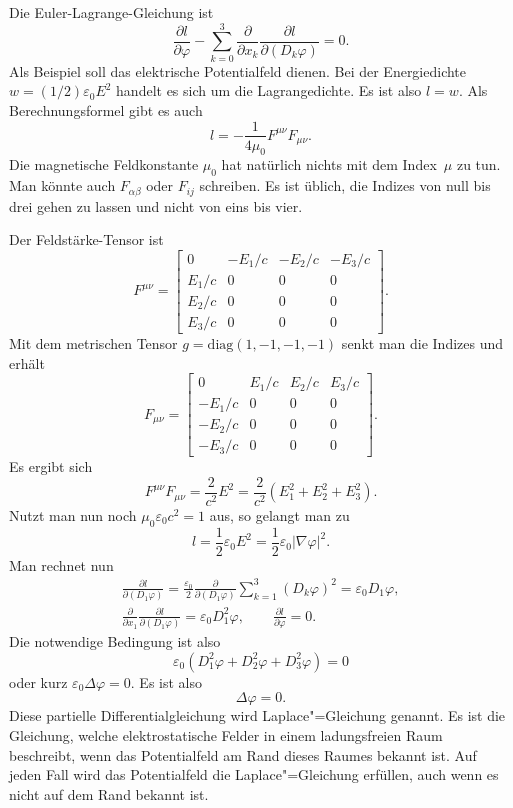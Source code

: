 \documentclass[a4paper,10pt,fleqn,twocolumn,twoside]{article}
\begin{document}
Die Euler-Lagrange-Gleichung ist
\[\frac{\partial l}{\partial\varphi}
- \sum_{k=0}^3 \frac{\partial}{\partial x_k}
\frac{\partial l}{\partial (D_k\varphi)}=0.\]
Als Beispiel soll das elektrische Potentialfeld dienen.
Bei der Energiedichte \(w=(1/2)\varepsilon_0 E^2\) handelt es sich
um die Lagrangedichte. Es ist also \(l=w\).
Als Berechnungsformel gibt es auch
\[l = -\frac{1}{4\mu_0} F^{\mu\nu}F_{\mu\nu}.\]
Die magnetische Feldkonstante \(\mu_0\) hat natürlich nichts
mit dem Index~\(\mu\) zu tun. Man könnte auch \(F_{\alpha\beta}\)
oder \(F_{ij}\) schreiben. Es ist üblich, die Indizes von null bis
drei gehen zu lassen und nicht von eins bis vier.

Der Feldstärke-Tensor ist
\[F^{\mu\nu} = \begin{bmatrix}
0 & -E_1/c & -E_2/c & -E_3/c\\
E_1/c & 0 & 0 & 0\\
E_2/c & 0 & 0 & 0\\
E_3/c & 0 & 0 & 0
\end{bmatrix}.\]
Mit dem metrischen Tensor \(g=\mathrm{diag}(1,-1,-1,-1)\) senkt man
die Indizes und erhält
\[F_{\mu\nu} = \begin{bmatrix}
0 & E_1/c & E_2/c & E_3/c\\
-E_1/c & 0 & 0 & 0\\
-E_2/c & 0 & 0 & 0\\
-E_3/c & 0 & 0 & 0
\end{bmatrix}.\]
Es ergibt sich
\[F^{\mu\nu}F_{\mu\nu} = \frac{2}{c^2} E^2
= \frac{2}{c^2} (E_1^2+E_2^2+E_3^2).\]
Nutzt man nun noch \(\mu_0\varepsilon_0 c^2=1\) aus, so gelangt man zu
\[l = \frac{1}{2}\varepsilon_0 E^2
= \frac{1}{2}\varepsilon_0 |\nabla\varphi|^2.\]
Man rechnet nun
\begin{gather*}
\frac{\partial l}{\partial(D_1\varphi)}
= \frac{\varepsilon_0}{2} \frac{\partial}{\partial(D_1\varphi)}
\sum_{k=1}^3 (D_k\varphi)^2 = \varepsilon_0 D_1\varphi,\\
\frac{\partial}{\partial x_1}\frac{\partial l}{\partial(D_1\varphi)}
= \varepsilon_0 D_1^2\varphi,\qquad
\frac{\partial l}{\partial\varphi} = 0.
\end{gather*}
Die notwendige Bedingung ist also
\[\varepsilon_0 (D_1^2\varphi+D_2^2\varphi+D_3^2\varphi) = 0\]
oder kurz \(\varepsilon_0 \Delta\varphi=0\). Es ist also
\[\Delta\varphi=0.\]
Diese partielle Differentialgleichung wird Laplace"=Gleichung genannt.
Es ist die Gleichung, welche elektrostatische Felder in einem
ladungsfreien Raum beschreibt, wenn das Potentialfeld am Rand dieses
Raumes bekannt ist. Auf jeden Fall wird das Potentialfeld die
Laplace"=Gleichung erfüllen, auch wenn es nicht auf dem Rand
bekannt ist.
\end{document}
